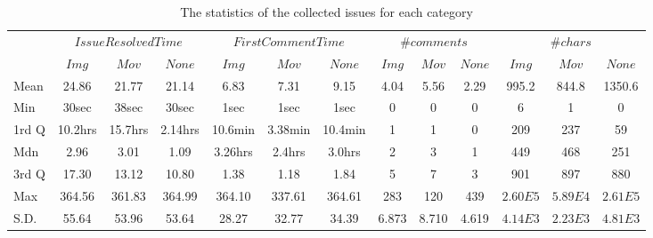 \begin{table*}[t]
  \begin{center}
  \caption{The statistics of the collected issues for each category}
  \begin{tabular}{l c c c| c c c| c c c| c c c} 
    \toprule
    & \multicolumn{3}{c}{$IssueResolvedTime$} & \multicolumn{3}{c}{$FirstCommentTime$} & \multicolumn{3}{c}{$\#comments$} & \multicolumn{3}{c}{$\#chars$}\\
    & \textbf{$Img$} & \textbf{$Mov$} & \textbf{$None$} & \textbf{$Img$} & \textbf{$Mov$} & \textbf{$None$} & \textbf{$Img$} & \textbf{$Mov$} & \textbf{$None$} & \textbf{$Img$} & \textbf{$Mov$} & \textbf{$None$} \\ 
    \midrule
    Mean & 24.86 & 21.77 & 21.14 & 6.83 & 7.31 & 9.15 &  4.04 & 5.56 & 2.29 &  995.2 & 844.8 & 1350.6 \\
    Min & 30sec & 38sec & 30sec & 1sec & 1sec & 1sec &  0 & 0 & 0 &  6 & 1 & 0 \\
    1rd Q & 10.2hrs & 15.7hrs & 2.14hrs &  10.6min & 3.38min & 10.4min &  1 & 1 & 0 &  209 & 237 & 59 \\
    Mdn & 2.96 & 3.01 & 1.09 &  3.26hrs & 2.4hrs & 3.0hrs &  2 & 3 & 1 &  449 & 468 & 251 \\
    3rd Q & 17.30 & 13.12 & 10.80  & 1.38 & 1.18 & 1.84 &  5 & 7 & 3 &  901 & 897 & 880 \\
    Max & 364.56 & 361.83 & 364.99 &  364.10 & 337.61 & 364.61 &  283 & 120 & 439 &  $2.60E5$ & $5.89E4$ & $2.61E5$ \\
    S.D. & 55.64 & 53.96 & 53.64 &  28.27 & 32.77 & 34.39 &  6.873 & 8.710 & 4.619 &  $4.14E3$ & $2.23E3$ & $4.81E3$ \\
    \bottomrule
  \end{tabular}
  \label{issue_class_data}
  \end{center}
\end{table*}
